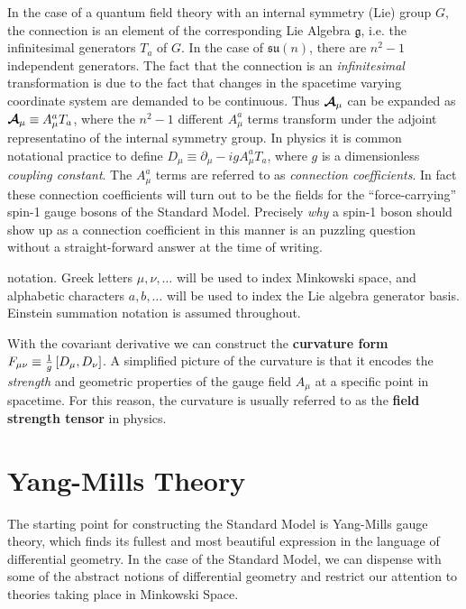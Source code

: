 In the case of a quantum field theory with an internal symmetry (Lie) group $G$, the connection is an element of the corresponding Lie Algebra $\mathfrak{g}$, i.e. the infinitesimal generators $T_a$ of $G$.
In the case of $\mathfrak{su}(n)$, there are $n^2-1$ independent generators. 
The fact that the connection is an \textit{infinitesimal} transformation is due to the fact that changes in the spacetime varying coordinate system are demanded to be continuous.
Thus $ \boldsymbol{\mathcal{A}} _\mu$ can be expanded as $ \boldsymbol{\mathcal{A}} _\mu \equiv A_\mu^a T_a$, where the $n^2-1$ different $A_\mu^a$ terms transform under the adjoint representatino of the internal symmetry group.
In physics it is common notational practice to define $D_\mu \equiv \partial_\mu - igA_\mu^aT_a$, where $g$ is a dimensionless \textit{coupling constant}.
The $A_\mu^a$ terms are referred to as \textit{connection coefficients}.
In fact these connection coefficients will turn out to be the fields for the ``force-carrying'' spin-1 gauge bosons of the Standard Model.
Precisely \textit{why} a spin-1 boson should show up as a connection coefficient in this manner is an puzzling question without a straight-forward answer at the time of writing.

\begin{remark}
notation. Greek letters $\mu,\nu,\dots$ will be used to index Minkowski space, and alphabetic characters $a,b,\dots$ will be used to index the Lie algebra generator basis.
Einstein summation notation is assumed throughout.
\end{remark}

With the covariant derivative we can construct the \textbf{curvature form} $F_{\mu\nu} \equiv \frac{1}{g}  \left[ {D_\mu},{D_\nu} \right] $.
A simplified picture of the curvature is that it encodes the \textit{strength} and geometric properties of the gauge field $A_\mu$ at a specific point in spacetime.
For this reason, the curvature is usually referred to as the \textbf{field strength tensor} in physics.

\section{Yang-Mills Theory}
The starting point for constructing the Standard Model is Yang-Mills gauge theory, which finds its fullest and most beautiful expression in the language of differential geometry.
In the case of the Standard Model, we can dispense with some of the abstract notions of differential geometry and restrict our attention to theories taking place in Minkowski Space.

